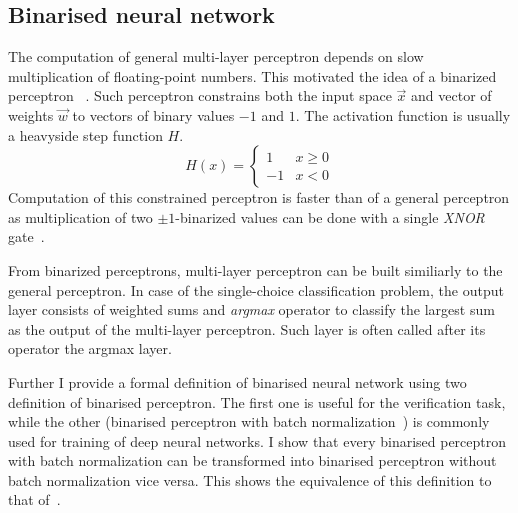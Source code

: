\sectionsep{}

\subsection{Binarised neural network}

The computation of general multi-layer perceptron depends on slow multiplication of
floating-point numbers. This motivated the idea of a binarized perceptron%
~\cite{courbariaux2016}.
Such perceptron constrains both the input space $\vec x$ and vector of weights $\vec w$
to vectors of binary values $-1$ and $1$. The activation function is usually
a heavyside step function $H$.
\begin{equation*}
	H(x) = \left\{\begin{array}{ll}
			1 & x \geq 0\\
			-1 & x < 0
		\end{array}\right.
\end{equation*}
Computation of this constrained perceptron is faster than of a general perceptron
as multiplication of two $\pm 1$-binarized values can be done with a single \textit{XNOR}
gate~\cite{courbariaux2016}.

From binarized perceptrons, multi-layer perceptron can be built similiarly
to the general perceptron. In case of the single-choice classification problem,
the output layer consists of weighted sums and \textit{argmax} operator
to classify the largest sum as the output of the multi-layer perceptron.
Such layer is often called after its operator the argmax layer.

Further I provide a formal definition of binarised neural network
using two definition of binarised perceptron.
The first one is useful for the verification task, while the other
(binarised perceptron with batch normalization~\cite{zhang2021bdd4bnn})
is commonly used for training of deep neural networks. I show that
every binarised perceptron with batch normalization
can be transformed into binarised perceptron without batch normalization
vice versa. This shows the equivalence of this definition
to that of~\cite{zhang2021bdd4bnn}.

\sectionsep{}


